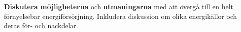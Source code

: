 \documentclass{exam}
\begin{document}
\begin{questions}
\break
\vspace{5mm} %
\begin{center}
\end{center}
\vspace{5mm} %
\question 
\textbf{Diskutera möjligheterna} och \textbf{utmaningarna} med att övergå till en helt förnyelsebar energiförsörjning. Inkludera diskussion om olika energikällor och deras för- och nackdelar.

\end{questions}
\end{document}
